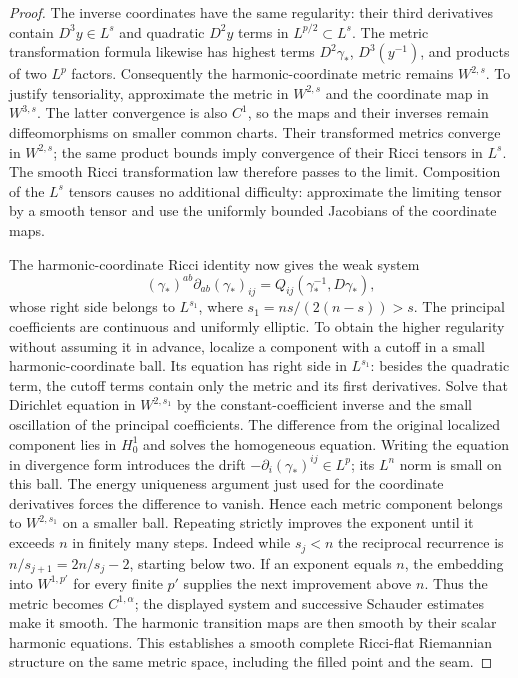 \begin{proof}
The inverse coordinates have the same regularity: their third
derivatives contain $D^3y\in L^s$ and quadratic $D^2y$ terms in
$L^{p/2}\subset L^s$.  The metric transformation formula likewise
has highest terms $D^2\gamma_*$, $D^3(y^{-1})$, and products of
two $L^p$ factors.  Consequently the harmonic-coordinate metric
remains $W^{2,s}$.  To justify tensoriality, approximate the metric
in $W^{2,s}$ and the coordinate map in $W^{3,s}$.  The latter
convergence is also $C^1$, so the maps and their inverses remain
diffeomorphisms on smaller common charts.  Their transformed
metrics converge in $W^{2,s}$; the same product bounds imply
convergence of their Ricci tensors in $L^s$.  The smooth Ricci
transformation law therefore passes to the limit.  Composition
of the $L^s$ tensors causes no additional difficulty: approximate
the limiting tensor by a smooth tensor and use the uniformly
bounded Jacobians of the coordinate maps.

The harmonic-coordinate Ricci identity
\cite[Equation~(4.3)]{DeTurckKazdan1981} now gives the weak system
\[
 (\gamma_*)^{ab}\partial_{ab}(\gamma_*)_{ij}
       =Q_{ij}(\gamma_*^{-1},D\gamma_*),
\]
whose right side belongs to
$L^{s_1}$, where $s_1=ns/(2(n-s))>s$.
The principal coefficients are continuous and uniformly elliptic.
To obtain the higher regularity without assuming it in advance,
localize a component with a cutoff in a small harmonic-coordinate
ball.  Its equation has right side in $L^{s_1}$: besides the quadratic
term, the cutoff terms contain only the metric and its first
derivatives.  Solve that Dirichlet equation in $W^{2,s_1}$ by the
constant-coefficient inverse and the small oscillation of the
principal coefficients.  The difference from the original localized
component lies in $H^1_0$ and solves the homogeneous equation.
Writing the equation in divergence form introduces the drift
$-\partial_i(\gamma_*)^{ij}\in L^p$; its $L^n$ norm is small on
this ball.  The energy uniqueness argument just used for the
coordinate derivatives forces the difference to vanish.  Hence each
metric component belongs to $W^{2,s_1}$ on a smaller ball.
Repeating strictly improves the exponent until it exceeds $n$ in
finitely many steps.  Indeed while $s_j<n$ the reciprocal recurrence
is $n/s_{j+1}=2n/s_j-2$, starting below two.  If an exponent equals
$n$, the embedding into $W^{1,p'}$ for every finite $p'$ supplies
the next improvement above $n$.  Thus the metric becomes
$C^{1,\alpha}$; the displayed system and successive Schauder
estimates make it smooth.  The harmonic transition maps are then
smooth by their scalar harmonic equations.  This establishes a
smooth complete Ricci-flat Riemannian structure on the same metric
space, including the filled point and the seam.


\end{proof}

